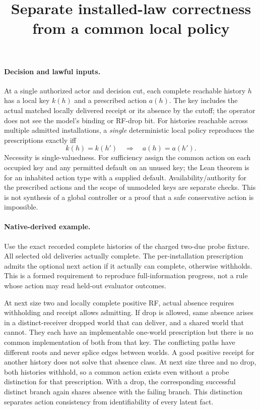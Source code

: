 \documentclass{article}
\title{Separate installed-law correctness from a common local policy}
\author{}\date{}
\begin{document}
\maketitle
\paragraph{Decision and lawful inputs.}
At a single authorized actor and decision cut, each complete reachable
history $h$ has a local key $k(h)$ and a prescribed action $a(h)$.
The key includes the actual matched locally delivered receipt or its
absence by the cutoff; the operator does not see the model's binding
or RF-drop bit. For histories reachable across multiple admitted
installations, a \emph{single} deterministic local policy reproduces
the prescriptions exactly iff
\[
          k(h)=k(h')\quad\Longrightarrow\quad a(h)=a(h').
\]
Necessity is single-valuedness. For sufficiency assign the common action
on each occupied key and any permitted default on an unused key; the
Lean theorem is for an inhabited action type with a supplied default.
Availability/authority for the prescribed actions and the scope of
unmodeled keys are separate checks. This is not synthesis of a global
controller or a proof that a safe conservative action is impossible.

\paragraph{Native-derived example.}
Use the exact recorded complete histories of the charged two-due
probe fixture. All selected old deliveries actually complete.
The per-installation prescription admits the optional next action
if it actually can complete, otherwise withholds. This is a formed
requirement to reproduce full-information progress, not a rule
whose action may read held-out evaluator outcomes.

At next size two and locally complete positive RF, actual absence
requires withholding and receipt allows admitting. If drop is allowed,
same absence arises in a distinct-receiver dropped world that can
deliver, and a shared world that cannot. They each have an implementable
one-world prescription but there is no common implementation of
both from that key. The conflicting paths have different roots
and never splice edges between worlds. A good positive receipt for
another history does not solve that absence class. At next size three
and no drop, both histories withhold, so a common action exists even
without a probe distinction for that prescription. With a drop,
the corresponding successful distinct branch again shares absence with
the failing branch. This distinction separates action consistency
from identifiability of every latent fact.
\end{document}
